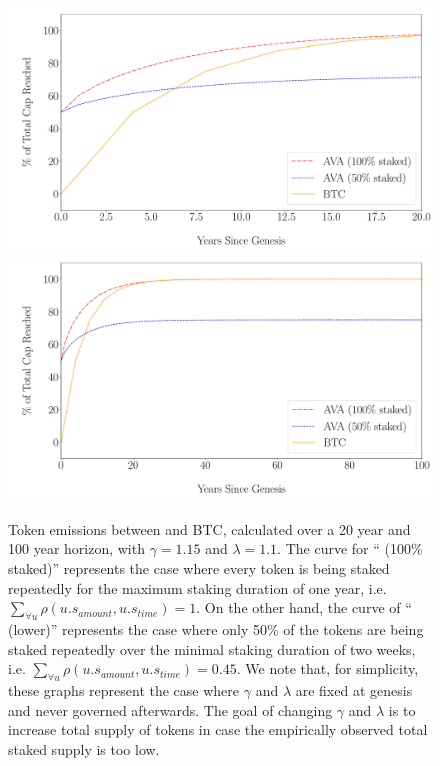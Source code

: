 \documentclass[runningheads]{llncs}
\begin{document}
\begin{figure}[h!]
\centering
\includegraphics[width=\linewidth]{./mintingfunction_20years.pdf}
\includegraphics[width=\linewidth]{./mintingfunction_100years.pdf}
\caption{Token emissions between \AVATokenName{} and BTC, calculated over a 20 year and 100 year horizon, with $\gamma = 1.15$ and $\lambda=1.1$. The curve for ``\AVATokenName{} (100\% staked)'' represents the case where every token is being staked repeatedly for the maximum staking duration of one year, i.e. $\sum_{\forall u} \rho(u.s_{amount}, u.s_{time}) = 1$. On the other hand, the curve of ``\AVATokenName{} (lower)'' represents the case where only 50\% of the tokens are being staked repeatedly over the minimal staking duration of two weeks, i.e. $\sum_{\forall u} \rho(u.s_{amount}, u.s_{time}) = 0.45$. We note that, for simplicity, these graphs represent the case where $\gamma$ and $\lambda$ are fixed at genesis and never governed afterwards. The goal of changing $\gamma$ and $\lambda$ is to increase total supply of tokens in case the empirically observed total staked supply is too low.}
\label{fig:mintingfunction-graph}
\end{figure}
\clearpage
\end{document}
